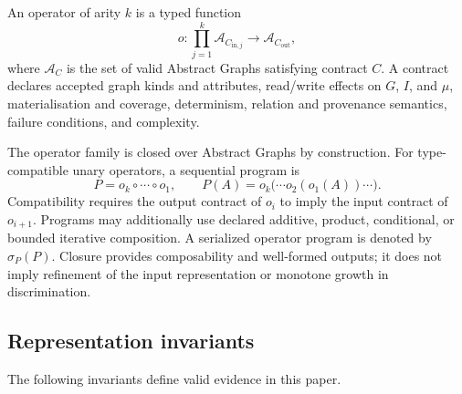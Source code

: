 \begin{definition}
An operator of arity $k$ is a typed function
\begin{equation}
  o:\prod_{j=1}^{k}\mathcal{A}_{C_{\mathrm{in},j}}\to
    \mathcal{A}_{C_{\mathrm{out}}},
\end{equation}
where \(\mathcal{A}_C\) is the set of valid Abstract Graphs satisfying
contract \(C\). A contract declares accepted graph kinds and attributes,
read/write effects on \(G\), \(I\), and \(\mu\), materialisation and coverage,
determinism, relation and provenance semantics, failure conditions, and
complexity.
\end{definition}

The operator family is closed over Abstract Graphs by construction. For
type-compatible unary operators, a sequential program is
\begin{equation}
  P=o_k\circ\cdots\circ o_1,
  \qquad P(A)=o_k\bigl(\cdots o_2(o_1(A))\cdots\bigr).
\end{equation}
Compatibility requires the output contract of \(o_i\) to imply the input
contract of \(o_{i+1}\). Programs may additionally use declared additive,
product, conditional, or bounded iterative composition. A serialized operator
program is denoted by \(\sigma_P(P)\). Closure provides composability and
well-formed outputs; it does not imply refinement of the input representation
or monotone growth in discrimination.

\subsection{Representation invariants}
\label{app:invariants}

The following invariants define valid evidence in this paper.

